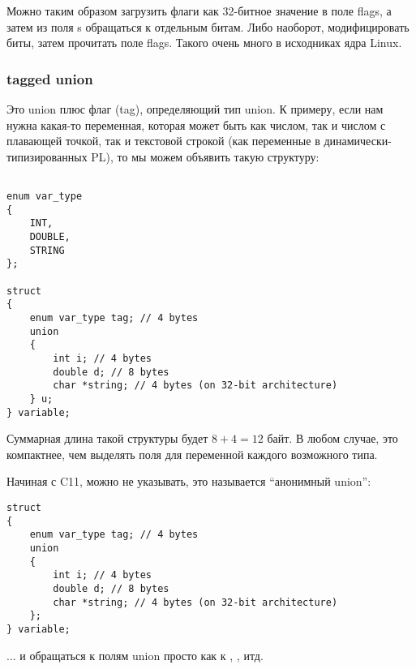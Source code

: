 Можно таким образом загрузить флаги как 32-битное значение в поле flags, а затем из поля s обращаться
к отдельным битам. Либо наоборот, модифицировать биты, затем прочитать поле flags. Такого очень много
в исходниках ядра Linux.

\subsubsection{tagged union}

Это union плюс флаг (tag), определяющий тип union. К примеру, если нам нужна какая-то переменная,
которая может быть как числом, так и числом с плавающей точкой, так и текстовой строкой (как переменные
в динамически-типизированных \ac{PL}), то мы можем объявить такую структуру:

\begin{lstlisting}

enum var_type
{
	INT,
	DOUBLE,
	STRING
};

struct
{
	enum var_type tag; // 4 bytes
	union
	{
		int i; // 4 bytes
		double d; // 8 bytes
		char *string; // 4 bytes (on 32-bit architecture)
	} u;
} variable;
\end{lstlisting}

Суммарная длина такой структуры будет $8+4=12$ байт. В любом случае, это компактнее, чем выделять
поля для переменной каждого возможного типа.

Начиная с C11\cite{C11},  можно не указывать, это называется ``анонимный union'':

\begin{lstlisting}
struct
{
	enum var_type tag; // 4 bytes
	union
	{
		int i; // 4 bytes
		double d; // 8 bytes
		char *string; // 4 bytes (on 32-bit architecture)
	};
} variable;
\end{lstlisting}

... и обращаться к полям union просто как к , , итд.

